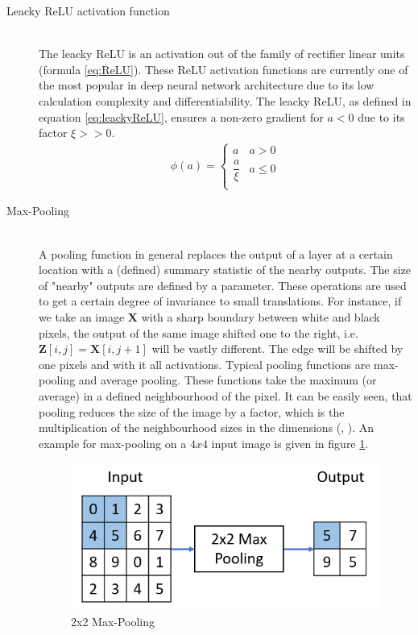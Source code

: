\documentclass[12pt,DIV14,BCOR12mm,a4paper,footexclude,headinclude,halfparskip-,twoside,openright,openany,cleardoubleempty,idxtotoc,bibtotoc]{scrreprt} %
\numberwithin{equation}{chapter}
\begin{document}
\begin{description}
	\item[Leacky ReLU activation function]\hfill \\
	The leacky ReLU \cite{Xu15LReLU} is an activation out of the family of rectifier linear units (formula \ref{eq:ReLU}). These ReLU activation functions are currently one of the most popular in deep neural network architecture due to its low calculation complexity and differentiability. The leacky ReLU, as defined in equation \ref{eq:leackyReLU}, ensures a non-zero gradient for $ a < 0$ due to its factor $\xi >> 0$.
	\begin{align}
		\phi(a) = \begin{cases} a & a > 0\\ \dfrac{a}{\xi} & a \leq 0\\ \end{cases} \label{eq:leackyReLU}
	\end{align}	
	\item[Max-Pooling]\hfill \\
	A pooling function in general replaces the output of a layer at a certain location with a (defined) summary statistic of the nearby outputs. The size of "nearby" outputs are defined by a parameter. These operations are used to get a certain degree of invariance to small translations. For instance, if we take an image $\mathbf{X}$ with a sharp boundary between white and black pixels, the output of the same image shifted one to the right, i.e. $\mathbf{Z}[i, j] = \mathbf{X}[i, j+1]$ will be vastly different. The edge will be shifted by one pixels and with it all activations. Typical pooling functions are max-pooling and average pooling. These functions take the maximum (or average) in a defined neighbourhood of the pixel. It can be easily seen, that pooling reduces the size of the image by a factor, which is the multiplication of the neighbourhood sizes in the dimensions (\cite{Goodfellow-et-al-2016}, \cite{DeepLearningDive}). An example for max-pooling on a $4x4$ input image is given in figure \ref{fig:Max-Pooling}.
\begin{figure}[htb!]
	\centering
	\includegraphics[width=0.5\linewidth]{Graphiken/2x2_MaxPooling}
	\caption{2x2 Max-Pooling}
	\label{fig:Max-Pooling}
\end{figure}	
\end{description}
\end{document}
